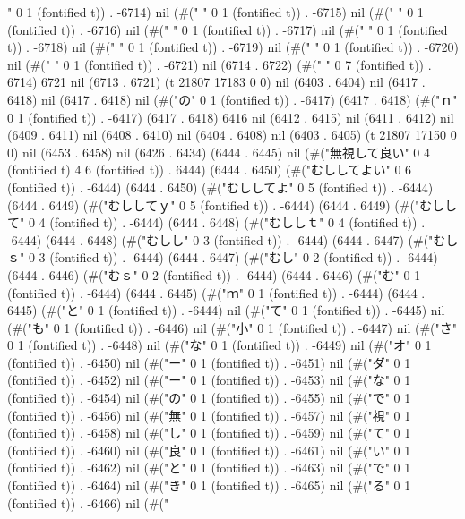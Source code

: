" 0 1 (fontified t)) . -6714) nil (#(" " 0 1 (fontified t)) . -6715) nil (#(" " 0 1 (fontified t)) . -6716) nil (#(" " 0 1 (fontified t)) . -6717) nil (#(" " 0 1 (fontified t)) . -6718) nil (#(" " 0 1 (fontified t)) . -6719) nil (#(" " 0 1 (fontified t)) . -6720) nil (#(" " 0 1 (fontified t)) . -6721) nil (6714 . 6722) (#("       " 0 7 (fontified t)) . 6714) 6721 nil (6713 . 6721) (t 21807 17183 0 0) nil (6403 . 6404) nil (6417 . 6418) nil (6417 . 6418) nil (#("の" 0 1 (fontified t)) . -6417) (6417 . 6418) (#("ｎ" 0 1 (fontified t)) . -6417) (6417 . 6418) 6416 nil (6412 . 6415) nil (6411 . 6412) nil (6409 . 6411) nil (6408 . 6410) nil (6404 . 6408) nil (6403 . 6405) (t 21807 17150 0 0) nil (6453 . 6458) nil (6426 . 6434) (6444 . 6445) nil (#("無視して良い" 0 4 (fontified t) 4 6 (fontified t)) . 6444) (6444 . 6450) (#("むししてよい" 0 6 (fontified t)) . -6444) (6444 . 6450) (#("むししてよ" 0 5 (fontified t)) . -6444) (6444 . 6449) (#("むししてｙ" 0 5 (fontified t)) . -6444) (6444 . 6449) (#("むしして" 0 4 (fontified t)) . -6444) (6444 . 6448) (#("むししｔ" 0 4 (fontified t)) . -6444) (6444 . 6448) (#("むしし" 0 3 (fontified t)) . -6444) (6444 . 6447) (#("むしｓ" 0 3 (fontified t)) . -6444) (6444 . 6447) (#("むし" 0 2 (fontified t)) . -6444) (6444 . 6446) (#("むｓ" 0 2 (fontified t)) . -6444) (6444 . 6446) (#("む" 0 1 (fontified t)) . -6444) (6444 . 6445) (#("ｍ" 0 1 (fontified t)) . -6444) (6444 . 6445) (#("と" 0 1 (fontified t)) . -6444) nil (#("て" 0 1 (fontified t)) . -6445) nil (#("も" 0 1 (fontified t)) . -6446) nil (#("小" 0 1 (fontified t)) . -6447) nil (#("さ" 0 1 (fontified t)) . -6448) nil (#("な" 0 1 (fontified t)) . -6449) nil (#("オ" 0 1 (fontified t)) . -6450) nil (#("ー" 0 1 (fontified t)) . -6451) nil (#("ダ" 0 1 (fontified t)) . -6452) nil (#("ー" 0 1 (fontified t)) . -6453) nil (#("な" 0 1 (fontified t)) . -6454) nil (#("の" 0 1 (fontified t)) . -6455) nil (#("で" 0 1 (fontified t)) . -6456) nil (#("無" 0 1 (fontified t)) . -6457) nil (#("視" 0 1 (fontified t)) . -6458) nil (#("し" 0 1 (fontified t)) . -6459) nil (#("て" 0 1 (fontified t)) . -6460) nil (#("良" 0 1 (fontified t)) . -6461) nil (#("い" 0 1 (fontified t)) . -6462) nil (#("と" 0 1 (fontified t)) . -6463) nil (#("で" 0 1 (fontified t)) . -6464) nil (#("き" 0 1 (fontified t)) . -6465) nil (#("る" 0 1 (fontified t)) . -6466) nil (#("
